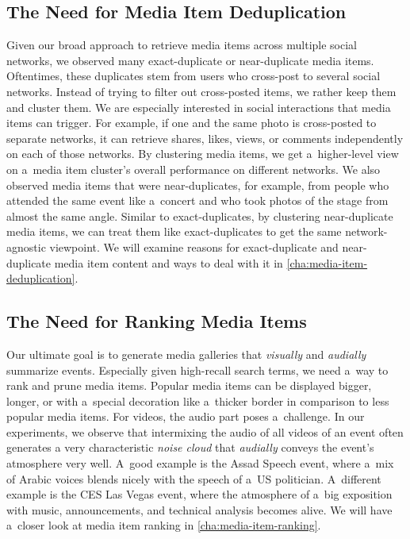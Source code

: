\subsection{The Need for Media Item Deduplication}
\label{sec:the-need-for-media-item-deduplication}

Given our broad approach to retrieve media items
across multiple social networks,
we observed many exact-duplicate or near-duplicate media items.
Oftentimes, these duplicates stem from users who
cross-post to several social networks.
Instead of trying to filter out cross-posted items,
we rather keep them and cluster them.
We are especially interested in social interactions
that media items can trigger.
For example, if one and the same photo
is cross-posted to separate networks,
it can retrieve shares, likes, views, or comments
independently on each of those networks.
By clustering media items, we get a~higher-level view on
a~media item cluster's overall performance on different networks.
We also observed media items that were near-duplicates,
for example, from people who attended the same event like a~concert
and who took photos of the stage from almost the same angle.
Similar to exact-duplicates,
by clustering near-duplicate media items,
we can treat them like exact-duplicates to get the same
network-agnostic viewpoint.
We will examine reasons for exact-duplicate and near-duplicate
media item content and ways to deal with it in \autoref{cha:media-item-deduplication}.

\subsection{The Need for Ranking Media Items}

Our ultimate goal is to generate media galleries
that \emph{visually} and \emph{audially} summarize events.
Especially given high-recall search terms,
we need a~way to rank and prune media items.
Popular media items can be displayed bigger, longer,
or with a~special decoration like a~thicker border
in comparison to less popular media items.
For videos, the audio part poses a~challenge.
In our experiments, we observe that intermixing the audio
of all videos of an event often generates
a very characteristic \emph{noise cloud}
that \emph{audially} conveys the event's atmosphere very well.
A~good example is the Assad Speech event,
where a~mix of Arabic voices blends nicely
with the speech of a~US politician.
A~different example is the CES Las Vegas event,
where the atmosphere of a~big exposition with music,
announcements, and technical analysis becomes alive.
We will have a~closer look at media item ranking in
\autoref{cha:media-item-ranking}.

